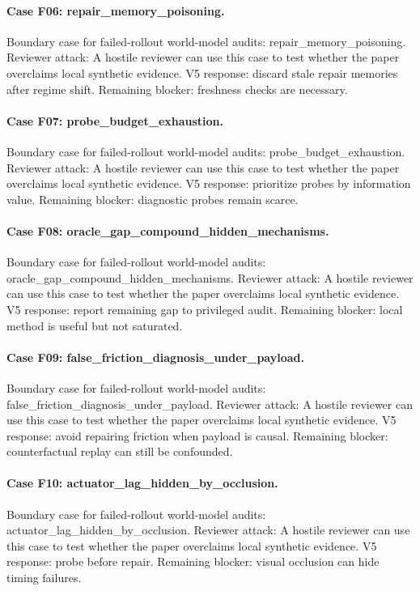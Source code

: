 \documentclass{article}
\begin{document}
\paragraph{Case F06: repair\_memory\_poisoning.} Boundary case for failed-rollout world-model audits: repair\_memory\_poisoning. Reviewer attack: A hostile reviewer can use this case to test whether the paper overclaims local synthetic evidence. V5 response: discard stale repair memories after regime shift. Remaining blocker: freshness checks are necessary.
\paragraph{Case F07: probe\_budget\_exhaustion.} Boundary case for failed-rollout world-model audits: probe\_budget\_exhaustion. Reviewer attack: A hostile reviewer can use this case to test whether the paper overclaims local synthetic evidence. V5 response: prioritize probes by information value. Remaining blocker: diagnostic probes remain scarce.
\paragraph{Case F08: oracle\_gap\_compound\_hidden\_mechanisms.} Boundary case for failed-rollout world-model audits: oracle\_gap\_compound\_hidden\_mechanisms. Reviewer attack: A hostile reviewer can use this case to test whether the paper overclaims local synthetic evidence. V5 response: report remaining gap to privileged audit. Remaining blocker: local method is useful but not saturated.
\paragraph{Case F09: false\_friction\_diagnosis\_under\_payload.} Boundary case for failed-rollout world-model audits: false\_friction\_diagnosis\_under\_payload. Reviewer attack: A hostile reviewer can use this case to test whether the paper overclaims local synthetic evidence. V5 response: avoid repairing friction when payload is causal. Remaining blocker: counterfactual replay can still be confounded.
\paragraph{Case F10: actuator\_lag\_hidden\_by\_occlusion.} Boundary case for failed-rollout world-model audits: actuator\_lag\_hidden\_by\_occlusion. Reviewer attack: A hostile reviewer can use this case to test whether the paper overclaims local synthetic evidence. V5 response: probe before repair. Remaining blocker: visual occlusion can hide timing failures.
\end{document}
